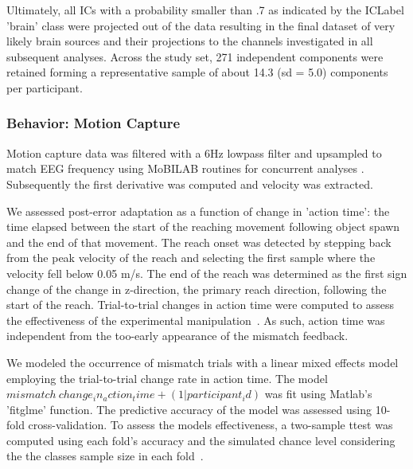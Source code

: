 Ultimately, all ICs with a probability smaller than .7 as indicated by the ICLabel 'brain' class were projected out of the data resulting in the final dataset of very likely brain sources and their projections to the channels investigated in all subsequent analyses. Across the study set, 271 independent components were retained forming a representative sample of about 14.3 (sd = 5.0) components per participant. 

\subsubsection{Behavior: Motion Capture}
Motion capture data was filtered with a 6Hz lowpass filter and upsampled to match EEG frequency using MoBILAB routines for concurrent analyses \cite{Ojeda2014}. Subsequently the first derivative was computed and velocity was extracted. 

We assessed post-error adaptation as a function of change in 'action time': the time elapsed between the start of the reaching movement following object spawn and the end of that movement. The reach onset was detected by stepping back from the peak velocity of the reach and selecting the first sample where the velocity fell below 0.05 m/s. The end of the reach was determined as the first sign change of the change in z-direction, the primary reach direction, following the start of the reach. Trial-to-trial changes in action time were computed to assess the effectiveness of the experimental manipulation~\cite{Dutilh2012}. As such, action time was independent from the too-early appearance of the mismatch feedback. 

We modeled the occurrence of mismatch trials with a linear mixed effects model employing the trial-to-trial change rate in action time. The model $mismatch ~ change_in_action_time + (1 | participant_id)$ was fit using Matlab's 'fitglme' function. The predictive accuracy of the model was assessed using 10-fold cross-validation. To assess the models effectiveness, a two-sample ttest was computed using each fold's accuracy and the simulated chance level considering the the classes sample size in each fold~\cite{Muller-Putz2007}.

